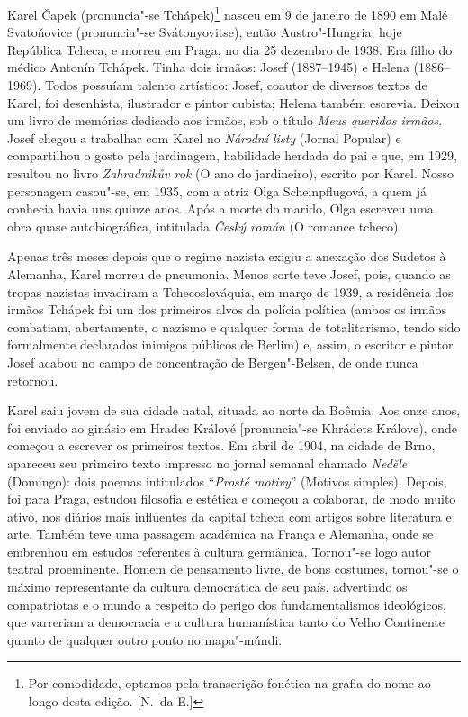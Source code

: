 Karel Čapek (pronuncia"-se Tchápek)\footnote{ Por comodidade, optamos pela transcrição fonética 
na grafia do nome ao longo desta edição. [N.~da E.]} 
nasceu em 9 de janeiro de 1890 em Malé
Svatoňovice (pronuncia"-se Svátonyovitse), então Austro"-Hungria, hoje República
Tcheca, e morreu em Praga, no dia 25 dezembro de 1938. Era filho do médico
Antonín Tchápek. Tinha dois irmãos: Josef (1887--1945) e Helena (1886--1969). Todos
possuíam talento artístico: Josef,  coautor de diversos textos de Karel, foi
desenhista, ilustrador e pintor cubista; Helena também escrevia. Deixou um
livro de memórias dedicado aos irmãos, sob o título \textit{Meus queridos irmãos}. Josef
chegou a trabalhar com Karel no \textit{Národní listy} (Jornal Popular) e compartilhou o
gosto pela jardinagem, habilidade herdada do pai e que, em 1929, resultou no
livro \textit{Zahradnikův rok} (O ano do jardineiro), escrito por Karel. Nosso
personagem casou"-se, em 1935, com a atriz Olga Scheinpflugová, a quem já
conhecia havia uns quinze anos. Após a morte do marido, Olga escreveu uma obra
quase autobiográfica, intitulada \textit{Český román} (O romance tcheco).

Apenas três meses depois que o regime nazista exigiu a anexação dos Sudetos
à Alemanha, Karel morreu de pneumonia. Menos sorte teve Josef, pois, quando as
tropas nazistas invadiram a Tchecoslováquia, em março de 1939, a residência dos
irmãos Tchápek foi um dos primeiros alvos da polícia política (ambos os irmãos
combatiam, abertamente, o nazismo e qualquer forma de totalitarismo, tendo sido
formalmente declarados inimigos públicos de Berlim) e, assim,  o
escritor e pintor Josef acabou no campo de concentração de Bergen"-Belsen, de onde
nunca retornou. 

Karel saiu jovem de sua cidade natal, situada ao norte da Boêmia. Aos onze
anos, foi enviado ao ginásio em Hradec Králové [pronuncia"-se Khrádets Králove),
onde começou a escrever os primeiros textos. Em abril de 1904, na cidade de
Brno, apareceu seu primeiro texto impresso no jornal semanal chamado \textit{Ned\u{e}le} (Domingo): 
dois poemas intitulados ``\textit{Prosté motivy}'' (Motivos simples). Depois,
foi para Praga, estudou filosofia e estética e começou a colaborar, de modo
muito ativo, nos diários mais influentes da capital tcheca com artigos sobre
literatura e arte. Também teve uma passagem acadêmica na França e Alemanha,
onde se embrenhou em estudos referentes à cultura germânica. Tornou"-se logo
autor teatral proeminente. Homem de pensamento livre, de bons costumes,
tornou"-se o máximo representante da cultura democrática de seu país, advertindo
os compatriotas e o mundo a respeito do perigo dos fundamentalismos
ideológicos, que varreriam a democracia e a cultura humanística tanto do Velho
Continente quanto de qualquer outro ponto no mapa"-múndi. 

